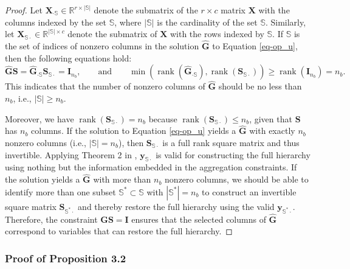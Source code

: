 \documentclass[
  11pt]{article}
\theoremstyle{plain}
\theoremstyle{remark}
\begin{document}
\begin{proof}
Let \(\bm{X}_{\cdot \mathbb{S}} \in \mathbb{R}^{r \times |\mathbb{S}|}\)
denote the submatrix of the \(r \times c\) matrix \(\bm{X}\) with the
columns indexed by the set \(\mathbb{S}\), where \(|\mathbb{S}|\) is the
cardinality of the set \(\mathbb{S}\). Similarly, let
\(\bm{X}_{\mathbb{S}\cdot} \in \mathbb{R}^{|\mathbb{S}| \times c}\)
denote the submatrix of \(\bm{X}\) with the rows indexed by
\(\mathbb{S}\). If \(\mathbb{S}\) is the set of indices of nonzero
columns in the solution \(\hat{\bm{G}}\) to Equation \eqref{eq-op_u},
then the following equations hold: \[
\hat{\bm{G}}\bm{S} = \hat{\bm{G}}_{\cdot \mathbb{S}}\bm{S}_{\mathbb{S}\cdot} = \bm{I}_{n_b},
\qquad\text{and}\qquad
\min \left(\operatorname{rank}(\hat{\bm{G}}_{\cdot \mathbb{S}}), \operatorname{rank}(\bm{S}_{\mathbb{S}\cdot})\right) \geq \operatorname{rank}(\bm{I}_{n_b})=n_b.
\] This indicates that the number of nonzero columns of \(\hat{\bm{G}}\)
should be no less than \(n_b\), i.e., \(|\mathbb{S}| \geq n_b\).

Moreover, we have
\(\operatorname{rank}(\bm{S}_{\mathbb{S}\cdot}) = n_b\) because
\(\operatorname{rank}(\bm{S}_{\mathbb{S}\cdot}) \leq n_b\), given that
\(\bm{S}\) has \(n_b\) columns. If the solution to Equation
\eqref{eq-op_u} yields a \(\hat{\bm{G}}\) with exactly \(n_b\) nonzero
columns (i.e., \(|\mathbb{S}|=n_b\)), then \(\bm{S}_{\mathbb{S}\cdot}\)
is a full rank square matrix and thus invertible. Applying Theorem 2 in
\citet{Zhang2023-op}, \(\bm{y}_{\mathbb{S}\cdot}\) is valid for
constructing the full hierarchy using nothing but the information
embedded in the aggregation constraints. If the solution yields a
\(\hat{\bm{G}}\) with more than \(n_b\) nonzero columns, we should be
able to identify more than one subset
\(\mathbb{S}^* \subset \mathbb{S}\) with \(|\mathbb{S}^*|=n_b\) to
construct an invertible square matrix \(\bm{S}_{\mathbb{S}^{*}\cdot}\)
and thereby restore the full hierarchy using the valid
\(\bm{y}_{\mathbb{S}^{*}\cdot}\). Therefore, the constraint
\(\bm{GS}=\bm{I}\) ensures that the selected columns of \(\hat{\bm{G}}\)
correspond to variables that can restore the full hierarchy.
\end{proof}

\subsubsection{Proof of Proposition 3.2}\label{proof-of-proposition-3.2}
\end{document}
